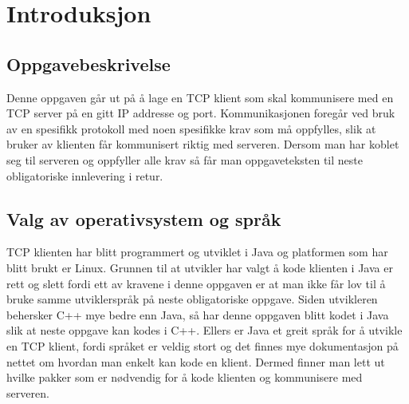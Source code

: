 \section{Introduksjon}
\subsection{Oppgavebeskrivelse}
Denne oppgaven går ut på å lage en TCP klient som skal kommunisere med en TCP server på en gitt IP addresse og port. Kommunikasjonen foregår ved bruk av en spesifikk protokoll med noen spesifikke krav som må oppfylles, slik at bruker av klienten får kommunisert riktig med serveren. Dersom man har koblet seg til serveren og oppfyller alle krav så får man oppgaveteksten til neste obligatoriske innlevering i retur.

\subsection{Valg av operativsystem og språk}
TCP klienten har blitt programmert og utviklet i Java og platformen som har blitt brukt er Linux. Grunnen til at utvikler har valgt å kode klienten i Java er rett og slett fordi ett av kravene i denne oppgaven er at man ikke får lov til å bruke samme utviklerspråk på neste obligatoriske oppgave. Siden utvikleren behersker C++ mye bedre enn Java, så har denne oppgaven blitt kodet i Java slik at neste oppgave kan kodes i C++. Ellers er Java et greit språk for å utvikle en TCP klient, fordi språket er veldig stort og det finnes mye dokumentasjon på nettet om hvordan man enkelt kan kode en klient. Dermed finner man lett ut hvilke pakker som er nødvendig for å kode klienten og kommunisere med serveren.

